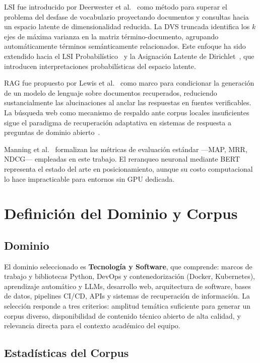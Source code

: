 \documentclass[runningheads,a4paper]{llncs}
\begin{document}
LSI fue introducido por Deerwester et al.~\cite{deerwester1990} como método para superar el problema del desfase de vocabulario proyectando documentos y consultas hacia un espacio latente de dimensionalidad reducida. La DVS truncada identifica los $k$ ejes de máxima varianza en la matriz término-documento, agrupando automáticamente términos semánticamente relacionados. Este enfoque ha sido extendido hacia el LSI Probabilístico~\cite{hofmann1999} y la Asignación Latente de Dirichlet~\cite{blei2003}, que introducen interpretaciones probabilísticas del espacio latente.

RAG fue propuesto por Lewis et al.~\cite{lewis2020} como marco para condicionar la generación de un modelo de lenguaje sobre documentos recuperados, reduciendo sustancialmente las alucinaciones al anclar las respuestas en fuentes verificables. La búsqueda web como mecanismo de respaldo ante corpus locales insuficientes sigue el paradigma de recuperación adaptativa en sistemas de respuesta a preguntas de dominio abierto~\cite{karpukhin2020}.

Manning et al.~\cite{manning2008} formalizan las métricas de evaluación estándar —MAP, MRR, NDCG— empleadas en este trabajo. El reranqueo neuronal mediante BERT~\cite{nogueira2019} representa el estado del arte en posicionamiento, aunque su costo computacional lo hace impracticable para entornos sin GPU dedicada.

\section{Definición del Dominio y Corpus}

\subsection{Dominio}

El dominio seleccionado es \textbf{Tecnología y Software}, que comprende: marcos de trabajo y bibliotecas Python, DevOps y contenedorización (Docker, Kubernetes), aprendizaje automático y LLMs, desarrollo web, arquitectura de software, bases de datos, pipelines CI/CD, APIs y sistemas de recuperación de información. La selección responde a tres criterios: amplitud temática suficiente para generar un corpus diverso, disponibilidad de contenido técnico abierto de alta calidad, y relevancia directa para el contexto académico del equipo.

\subsection{Estadísticas del Corpus}
\end{document}
